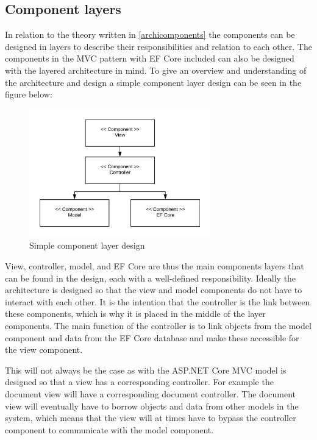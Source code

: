 \subsection{Component layers}
In relation to the theory written in \cref{archicomponents} the components can be designed in layers to describe their responsibilities and relation to each other.
The components in the MVC pattern with EF Core included can also be designed with the layered architecture in mind.
To give an overview and understanding of the architecture and design a simple component layer design can be seen in the figure below:

\begin{figure}[H]
	\centering
	\includegraphics[width=0.7\textwidth]{billeder/simplecomponents.jpeg}
	\caption{Simple component layer design}
\end{figure}


View, controller, model, and EF Core are thus the main components layers that can be found in the design, each with a well-defined responsibility.
Ideally the architecture is designed so that the view and model components do not have to interact with each other.
It is the intention that the controller is the link between these components, which is why it is placed in the middle of the layer components.
The main function of the controller is to link objects from the model component and data from the EF Core database and make these accessible for the view component.

This will not always be the case as with the ASP.NET Core MVC model is designed so that a view has a corresponding controller.
For example the document view will have a corresponding document controller.
The document view will eventually have to borrow objects and data from other models in the system, which means that the view will at times have to bypass the controller component to communicate with the model component.

